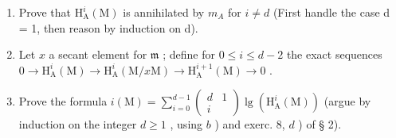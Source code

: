 \begin{enumerate}
\def\labelenumi{\alph{enumi})}
\item
  Prove that \(\mathrm{H}_{\mathrm{A}}^{i}(\mathrm{M})\) is annihilated by \(m_{A}\) for \(i \neq d\) (First handle the case d = 1, then reason by induction on d).
\item
  Let \(x\) a secant element for \(\mathfrak{m}\) ; define for \(0 \leqslant i \leqslant d - 2\) the exact sequences \(0 \to \mathrm{H}_{\mathrm{A}}^{i}(\mathrm{M}) \to \mathrm{H}_{\mathrm{A}}^{i}(\mathrm{M}/x\mathrm{M}) \to \mathrm{H}_{\mathrm{A}}^{i+1}(\mathrm{M}) \to 0\) .
\item
  Prove the formula \(i(\mathrm{M}) = \sum_{i=0}^{d-1} \left( \begin{array}{cc} d & 1 \\ i & \end{array} \right) \lg(\mathrm{H}_{\mathrm{A}}^i(\mathrm{M}))\) (argue by induction on the integer \(d \geqslant 1\) , using \(b\) ) and exerc. 8, \(d\) ) of § 2).
\end{enumerate}

